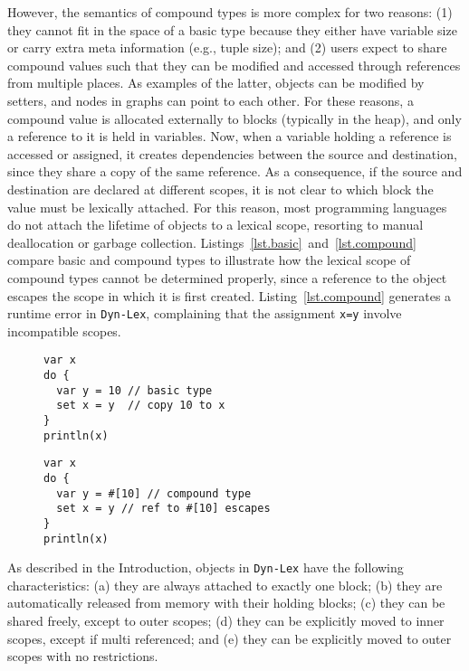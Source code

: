 \documentclass[12pt]{article}
\newcommand{\code}[1] {\texttt{\footnotesize{#1}}}
\newcommand{\lex} {\texttt{Dyn-Lex}\xspace}
\begin{document}
However, the semantics of compound types is more complex for two reasons:
    (1) they cannot fit in the space of a basic type because they either have
        variable size or carry extra meta information (e.g., tuple size); and
    (2) users expect to share compound values such that they can be modified
        and accessed through references from multiple places.
As examples of the latter, objects can be modified by setters, and nodes in
graphs can point to each other.
%
For these reasons, a compound value is allocated externally to blocks
(typically in the heap), and only a reference to it is held in variables.
Now, when a variable holding a reference is accessed or assigned, it creates
dependencies between the source and destination, since they share a copy of the
same reference.
%
As a consequence, if the source and destination are declared at different
scopes, it is not clear to which block the value must be lexically attached.
For this reason, most programming languages do not attach the lifetime of
objects to a lexical scope, resorting to manual deallocation or garbage
collection.
%
Listings~\ref{lst.basic}~and~\ref{lst.compound} compare basic and compound
types to illustrate how the lexical scope of compound types cannot be
determined properly, since a reference to the object escapes the scope in which
it is first created.
Listing~\ref{lst.compound} generates a runtime error in \lex, complaining that
the assignment \code{x=y} involve incompatible scopes.

\begin{figure}
\begin{minipage}[t]{0.5\textwidth}
\begin{lstlisting}[caption=Basic type escape., label=lst.basic]
var x
do {
  var y = 10 // basic type
  set x = y  // copy 10 to x
}
println(x)
\end{lstlisting}
\end{minipage}
\begin{minipage}[t]{0.5\textwidth}
\begin{lstlisting}[caption=Compound type escape., label=lst.compound]
var x
do {
  var y = #[10] // compound type
  set x = y // ref to #[10] escapes
}
println(x)
\end{lstlisting}
\end{minipage}
\end{figure}

As described in the Introduction, objects in \lex have the following
characteristics:
    (a) they are always attached to exactly one block;
    (b) they are automatically released from memory with their holding blocks;
    (c) they can be shared freely, except to outer scopes;
    (d) they can be explicitly moved to inner scopes, except if multi
        referenced; and
    (e) they can be explicitly moved to outer scopes with no restrictions.
\end{document}
